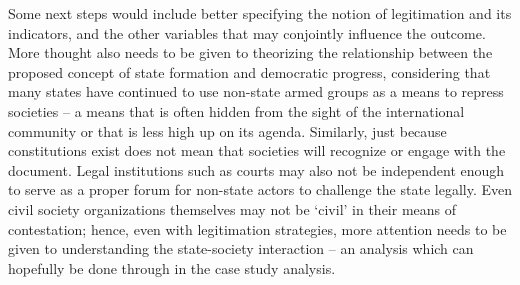 \documentclass [11pt]{article}
\begin{document}
Some next steps would include better specifying the notion of legitimation and its indicators, and the other variables that may conjointly influence the outcome. More thought also needs to be given to theorizing the relationship between the proposed concept of state formation and democratic progress, considering that many states have continued to use non-state armed groups as a means to repress societies -- a means that is often hidden from the sight of the international community or that is less high up on its agenda. Similarly, just because constitutions exist does not mean that societies will recognize or engage with the document. Legal institutions such as courts may also not be independent enough to serve as a proper forum for non-state actors to challenge the state legally. Even civil society organizations themselves may not be `civil' in their means of contestation; hence, even with legitimation strategies, more attention needs to be given to understanding the state-society interaction -- an analysis which can hopefully be done through in the case study analysis.


















\end{document}
